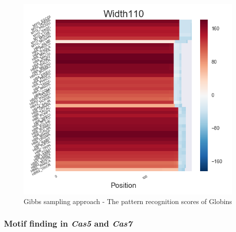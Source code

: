 \documentclass[11pt, oneside]{article}
\begin{document}
\begin{figure}[htbp]
\begin{minipage}{0.32\textwidth}
  \end{minipage}
  \hfill
  \begin{minipage}{0.32\textwidth}
    \centering
    \includegraphics[width=1\textwidth]{images/Width110_heatmap} %
  \end{minipage}
  \caption{Gibbs sampling approach - The pattern recognition scores of Globins}
  \label{fig:recog}
\end{figure}

\subsubsection{Motif finding in \textit{Cas5} and \textit{Cas7}}
\end{document}
